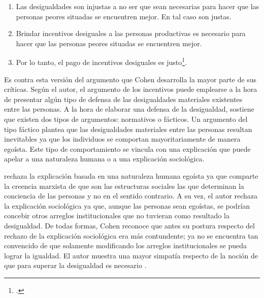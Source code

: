 \vspace{3mm}
\begin{enumerate}
    \item Las desigualdades son injustas a no ser que sean necesarias para hacer que las personas peores situadas se encuentren mejor. En tal caso son justas.
    \item Brindar incentivos desiguales a las personas productivas es necesario para hacer que las personas peores situadas se encuentren mejor.
    \item Por lo tanto, el pago de incentivos desiguales es justo\footnote{ \citep[p. 19]{Cohen_2008}.}.
\end{enumerate}
\vspace{3mm}

Es contra esta versión del argumento que Cohen desarrolla la mayor parte de sus críticas. Según el autor, el argumento de los incentivos puede emplearse a la hora de presentar algún tipo de defensa de las desigualdades materiales existentes entre las personas. A la hora de elaborar una defensa de la desigualdad, \citet{Cohen_2001} sostiene que existen dos tipos de argumentos: normativos o fácticos. Un argumento del tipo fáctico plantea que las desigualdades materiales entre las personas resultan inevitables ya que los individuos se comportan mayoritariamente de manera egoísta. Este tipo de comportamiento se vincula con una explicación que puede apelar a una naturaleza humana o a una explicación sociológica. 

\citet{Cohen_2001} rechaza la explicación basada en una naturaleza humana egoísta ya que comparte la creencia marxista de que son las estructuras sociales las que determinan la conciencia de las personas y no en el sentido contrario. A su vez, el autor rechaza la explicación sociológica ya que, aunque las personas sean egoístas, se podrían concebir otros arreglos institucionales que no tuvieran como resultado la desigualdad. De todas formas, Cohen reconoce que antes su postura respecto del rechazo de la explicación sociológica era más contundente; ya no se encuentra tan convencido de que solamente modificando los arreglos institucionales se pueda lograr la igualdad. El autor muestra una mayor simpatía respecto de la noción de que para superar la desigualdad es necesario   \citep[p. 163]{Cohen_2001}.

